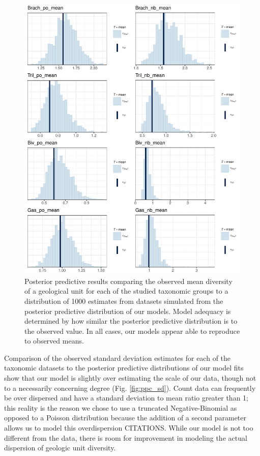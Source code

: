 \documentclass[12pt,letterpaper]{article}
\begin{document}
\begin{figure}[ht]
  \centering
  \includegraphics[width=\textwidth,height=0.5\textheight,keepaspectratio=true]{figure/ppc_mean}
  \caption{Posterior predictive results comparing the observed mean diversity of a geological unit for each of the studied taxonomic groups to a distribution of 1000 estimates from datasets simulated from the posterior predictive distribution of our models. Model adequacy is determined by how similar the posterior predictive distribution is to the observed value. In all cases, our models appear able to reproduce to observed means.}
  \label{fig:ppc_mean}
\end{figure}

Comparison of the observed standard deviation estimates for each of the taxonomic datasets to the posterior predictive distributions of our model fits show that our model is slightly over estimating the scale of our data, though not to a necessarily concerning degree (Fig. \ref{fig:ppc_sd}). Count data can frequently be over dispersed and have a standard deviation to mean ratio greater than 1; this reality is the reason we chose to use a truncated Negative-Binomial as opposed to a Poisson distribution because the addition of a second parameter allows us to model this overdispersion CITATIONS. While our model is not too different from the data, there is room for improvement in modeling the actual dispersion of geologic unit diversity.
\end{document}
